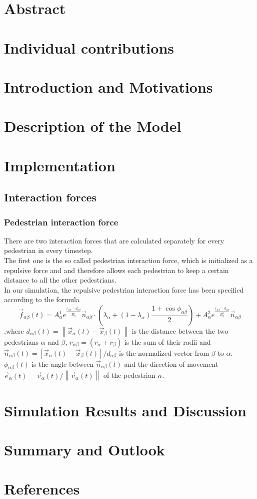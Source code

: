 \documentclass[11pt]{article}
\begin{document}
\section{Abstract}

\section{Individual contributions}

\section{Introduction and Motivations}

\section{Description of the Model}

\section{Implementation}
\subsection{Interaction forces}
\subsubsection{Pedestrian interaction force}
There are two interaction forces that are calculated separately for every pedestrian in every timestep. \\
The first one is the so called pedestrian interaction force, which is initialized as a repulsive force and and therefore allows each pedestrian to keep a certain distance to all the other pedestrians. \\
In our simulation, the repulsive pedestrian interaction force has been specified according to the formula
%
\begin{equation}
\vec{f}_{\alpha\beta}(t) = A_\alpha ^1 e^{\frac{r_{\alpha\beta} -d_{\alpha\beta}}{B_\alpha ^1}}\vec{n}_{\alpha\beta}
\cdot{\left(\lambda _\alpha + (1-\lambda _\alpha)
\frac{1+\cos{\phi_{\alpha\beta}}}{2}\right)}
+ A_\alpha ^2 e^{\frac{r_{\alpha\beta} -d_{\alpha\beta}}{B_\alpha ^2}}\vec{n}_{\alpha\beta}
\end{equation}
%
,where 
\(d_{\alpha\beta}(t)=\left\|\vec{x}_\alpha (t)-\vec{x}_\beta (t)\right\|\)
is the distance between the two pedestrians $\alpha$ and $\beta$, \(r_{\alpha\beta}=(r_\alpha + r_\beta)\) is the sum of their radii and 
\(\vec{n}_{\alpha\beta}(t)=[\vec{x}_\alpha(t)-\vec{x}_\beta(t)]/d_{\alpha\beta}\)
is the normalized vector from $\beta$ to $\alpha$.
\( \phi_{\alpha\beta}(t) \) is the angle between \(\vec{n}_{\alpha\beta}(t)\) and the direction of movement \( \vec{e}_\alpha(t)=\vec{v}_\alpha(t)/\left\|\vec{v}_\alpha(t)\right\| \) of the pedestrian $\alpha$.

\section{Simulation Results and Discussion}

\section{Summary and Outlook}

\section{References}
\end{document}
